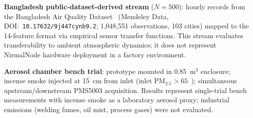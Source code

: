 \textbf{Bangladesh public-dataset-derived stream} ($N=500$): hourly records from the
Bangladesh Air Quality Dataset~\citep{paul2026bangladesh} (Mendeley Data,
DOI:~\texttt{10.17632/9j447cynb9.2}; 1,048,551 observations, 103 cities) mapped to the
14-feature format via empirical sensor transfer functions. This stream evaluates transferability
to ambient atmospheric dynamics; it does not represent NirmalNode hardware deployment in a
factory environment.

\textbf{Aerosol chamber bench trial}: prototype mounted in 0.85~m$^3$ enclosure; incense
smoke injected at 15~cm from inlet (inlet PM$_{2.5}>65$~\ugsm); simultaneous
upstream/downstream PMS5003 acquisition. Results represent single-trial bench measurements
with incense smoke as a laboratory aerosol proxy; industrial emissions (welding fumes, oil
mist, process gases) were not evaluated.
